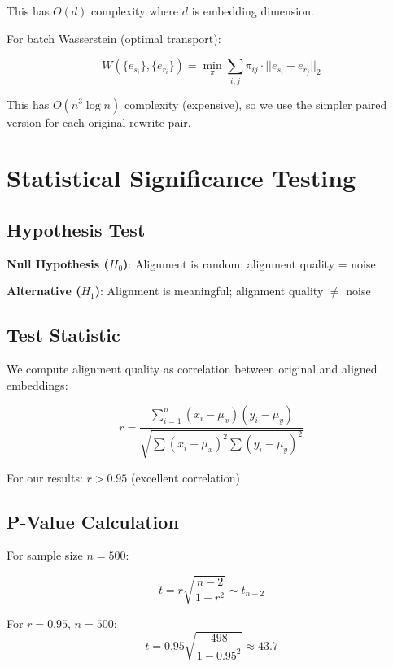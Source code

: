 \documentclass[12pt,a4paper,oneside]{report}
\begin{document}
This has $O(d)$ complexity where $d$ is embedding dimension.

For batch Wasserstein (optimal transport):

\begin{equation}
W(\{e_{s_i}\}, \{e_{r_i}\}) = \min_\pi \sum_{i,j} \pi_{ij} \cdot ||e_{s_i} - e_{r_j}||_2
\end{equation}

This has $O(n^3 \log n)$ complexity (expensive), so we use the simpler paired version for each original-rewrite pair.

\section{Statistical Significance Testing}

\subsection{Hypothesis Test}

\textbf{Null Hypothesis ($H_0$)}: Alignment is random; alignment quality = noise

\textbf{Alternative ($H_1$)}: Alignment is meaningful; alignment quality $\neq$ noise

\subsection{Test Statistic}

We compute alignment quality as correlation between original and aligned embeddings:

\begin{equation}
r = \frac{\sum_{i=1}^n (x_i - \mu_x)(y_i - \mu_y)}{\sqrt{\sum(x_i-\mu_x)^2 \sum(y_i-\mu_y)^2}}
\end{equation}

For our results: $r > 0.95$ (excellent correlation)

\subsection{P-Value Calculation}

For sample size $n = 500$:

\begin{equation}
t = r\sqrt{\frac{n-2}{1-r^2}} \sim t_{n-2}
\end{equation}

For $r = 0.95$, $n = 500$:
\begin{equation}
t = 0.95 \sqrt{\frac{498}{1-0.95^2}} \approx 43.7
\end{equation}
\end{document}
